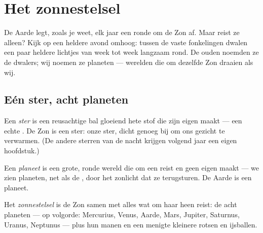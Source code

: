 \chapter{Het zonnestelsel}\label{ch:g4:solar-system}

De Aarde legt, zoals je weet, elk jaar een ronde om de Zon af. Maar
reist ze alleen? Kijk op een heldere avond omhoog: tussen de vaste
fonkelingen dwalen een paar heldere lichtjes van week tot week
langzaam rond. De ouden noemden ze de dwalers; wij noemen ze
planeten --- werelden die om dezelfde Zon draaien als wij.

\section{Eén ster, acht planeten}

\begin{definition}[Ster]\label{def:g4:solar-system:star}
Een \emph{ster} is een reusachtige bal gloeiend hete stof
die zijn eigen  maakt --- een echte . De Zon is een ster:
onze ster, dicht genoeg bij om ons gezicht te verwarmen. (De andere
sterren van de nacht krijgen volgend jaar een eigen hoofdstuk.)
\end{definition}

\begin{definition}[Planeet]\label{def:g4:solar-system:planet}
Een \emph{planeet} is een grote, ronde wereld die om
een  reist en geen eigen  maakt --- we zien planeten, net
als de , door het zonlicht dat ze terugsturen. De Aarde is een
planeet.
\end{definition}

\begin{definition}\label{def:g4:solar-system:family}
Het \emph{zonnestelsel} is de Zon samen met alles
wat om haar heen reist: de acht planeten --- op volgorde: Mercurius,
Venus, Aarde, Mars, Jupiter, Saturnus, Uranus, Neptunus --- plus hun
manen en een menigte kleinere rotsen en ijsballen.
\end{definition}

